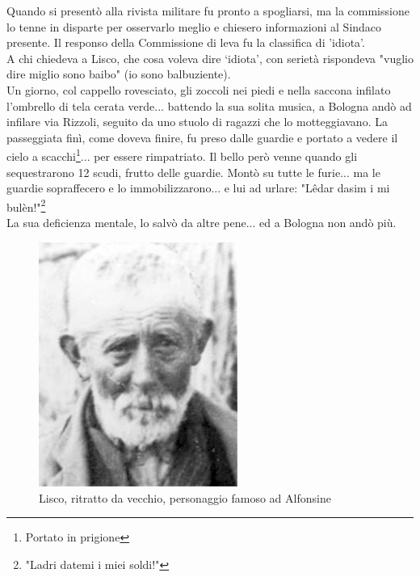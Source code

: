 Quando si presentò alla rivista militare fu pronto a spogliarsi, ma la commissione lo tenne in disparte per osservarlo meglio e chiesero informazioni al Sindaco presente. Il responso della Commissione di leva fu la classifica di 'idiota'.\\
A chi chiedeva a Lisco, che cosa voleva dire ‘idiota', con serietà rispondeva "vuglio dire miglio sono baibo" (io sono balbuziente).\\
Un giorno, col cappello rovesciato, gli zoccoli nei piedi e nella saccona infilato l'ombrello di tela cerata verde... battendo la sua solita musica, a Bologna andò ad infilare via Rizzoli, seguito da uno stuolo di ragazzi che lo motteggiavano. La passeggiata finì, come doveva finire, fu preso dalle guardie e portato a vedere il cielo a scacchi\footnote{Portato in prigione}... per essere rimpatriato. Il bello però venne quando gli sequestrarono 12 scudi, frutto delle guardie. Montò su tutte le furie... ma le guardie sopraffecero e lo immobilizzarono... e lui ad urlare: "Lêdar dasim i mi bulèn!"\footnote{"Ladri datemi i miei soldi!"}\\
La sua deficienza mentale, lo salvò da altre pene... ed a Bologna non andò più.\\

 \begin{figure}[htb]
    \centering
    \includegraphics[height=8cm]{Lisco}
    \caption{Lisco, ritratto da vecchio, personaggio famoso ad Alfonsine\label{fig:Lisco}}
\end{figure}



